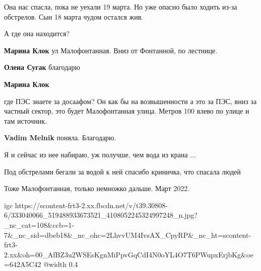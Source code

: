  
 
 
 
 

\qqSecCmt


Она нас спасла, пока не уехали 19 марта. Но уже опасно было ходить из-за
обстрелов. Сын 18 марта чудом остался жив.


А где она находится?

\begin{itemize} %
\textbf{Марина Клок} ул Малофонтанная. Вниз от Фонтанной, по лестнице.

\textbf{Олена Сугак} благодарю

\textbf{Марина Клок} 

где ПЭС знаете за досаафом? Он как бы на возвышенности а это за ПЭС, вниз за
частный сектор, это будет Малофонтанная улица. Метров 100 влево по улице и там
источник.

\textbf{Vadim Melnik} поняла. Благодарю.
\end{itemize} %


Я и сейчас из нее набираю, уж получше, чем вода из крана ...


Под обстрелами бегали за водой к ней спасибо криничка, что спасала людей


Тоже Малофонтанная, только немножко дальше. Март 2022.

\ifcmt
  igc https://scontent-frt3-2.xx.fbcdn.net/v/t39.30808-6/333040066_519488933673521_4108052245324997248_n.jpg?_nc_cat=108&ccb=1-7&_nc_sid=dbeb18&_nc_ohc=2LhvvUM4IvsAX_CpyRP&_nc_ht=scontent-frt3-2.xx&oh=00_AfBZ3u2WSEsKgnMiPpvGqCdI4N0oYL4O7T6PWupxErjbKg&oe=642A5C42
	@width 0.4
\fi

